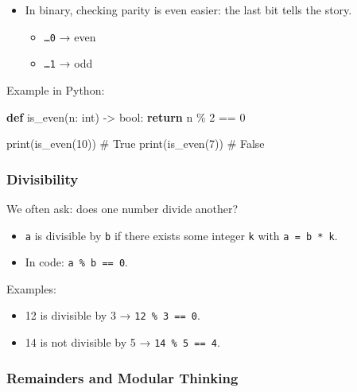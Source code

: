 \documentclass[
  letterpaper,
  DIV=11,
  numbers=noendperiod]{scrreprt}
\newenvironment{Shaded}{\begin{snugshade}}{\end{snugshade}}
\newcommand{\BuiltInTok}[1]{\textcolor[rgb]{0.00,0.23,0.31}{#1}}
\newcommand{\CommentTok}[1]{\textcolor[rgb]{0.37,0.37,0.37}{#1}}
\newcommand{\ControlFlowTok}[1]{\textcolor[rgb]{0.00,0.23,0.31}{\textbf{#1}}}
\newcommand{\DecValTok}[1]{\textcolor[rgb]{0.68,0.00,0.00}{#1}}
\newcommand{\KeywordTok}[1]{\textcolor[rgb]{0.00,0.23,0.31}{\textbf{#1}}}
\newcommand{\NormalTok}[1]{\textcolor[rgb]{0.00,0.23,0.31}{#1}}
\newcommand{\OperatorTok}[1]{\textcolor[rgb]{0.37,0.37,0.37}{#1}}
\providecommand{\tightlist}{%
  \setlength{\itemsep}{0pt}\setlength{\parskip}{0pt}}
\begin{document}
\begin{itemize}
\item
  In binary, checking parity is even easier: the last bit tells the
  story.

  \begin{itemize}
  \tightlist
  \item
    \texttt{…0} → even
  \item
    \texttt{…1} → odd
  \end{itemize}
\end{itemize}

Example in Python:

\begin{Shaded}
\begin{Highlighting}[]
\KeywordTok{def}\NormalTok{ is\_even(n: }\BuiltInTok{int}\NormalTok{) }\OperatorTok{{-}\textgreater{}} \BuiltInTok{bool}\NormalTok{:}
    \ControlFlowTok{return}\NormalTok{ n }\OperatorTok{\%} \DecValTok{2} \OperatorTok{==} \DecValTok{0}

\BuiltInTok{print}\NormalTok{(is\_even(}\DecValTok{10}\NormalTok{))  }\CommentTok{\# True}
\BuiltInTok{print}\NormalTok{(is\_even(}\DecValTok{7}\NormalTok{))   }\CommentTok{\# False}
\end{Highlighting}
\end{Shaded}

\subsubsection{Divisibility}\label{divisibility}

We often ask: does one number divide another?

\begin{itemize}
\tightlist
\item
  \texttt{a} is divisible by \texttt{b} if there exists some integer
  \texttt{k} with \texttt{a\ =\ b\ *\ k}.
\item
  In code: \texttt{a\ \%\ b\ ==\ 0}.
\end{itemize}

Examples:

\begin{itemize}
\tightlist
\item
  12 is divisible by 3 → \texttt{12\ \%\ 3\ ==\ 0}.
\item
  14 is not divisible by 5 → \texttt{14\ \%\ 5\ ==\ 4}.
\end{itemize}

\subsubsection{Remainders and Modular
Thinking}\label{remainders-and-modular-thinking}
\end{document}
